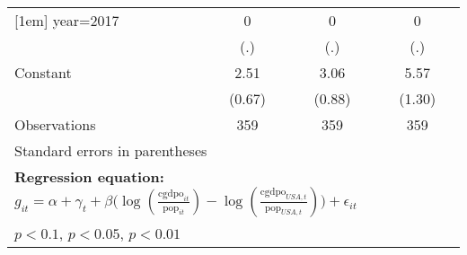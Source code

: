 \begin{sidewaystable}[htbp]
\begin{tabular}{l*{3}{c}}
[1em]
year=2017       &        0         &        0         &        0         \\
                &      (.)         &      (.)         &      (.)         \\
[1em]
Constant        &     2.51\sym{***}&     3.06\sym{***}&     5.57\sym{***}\\
                &   (0.67)         &   (0.88)         &   (1.30)         \\
\hline
Observations    &      359         &      359         &      359         \\
\hline\hline
\multicolumn{4}{l}{\footnotesize Standard errors in parentheses}\\
\multicolumn{4}{l}{\footnotesize \textbf{Regression equation:} \(g_{it} = \alpha + \gamma_t + \beta \big(\log (\frac{\textrm{cgdpo}_{it}}{\textrm{pop}_{it}} ) - \log (\frac{\textrm{cgdpo}_{USA,t}}{\textrm{pop}_{USA,t}}  ) \big) + \epsilon_{it}\)}\\
\multicolumn{4}{l}{\footnotesize \sym{*} \(p<0.1\), \sym{**} \(p<0.05\), \sym{***} \(p<0.01\)}\\
\end{tabular}
\end{sidewaystable}
